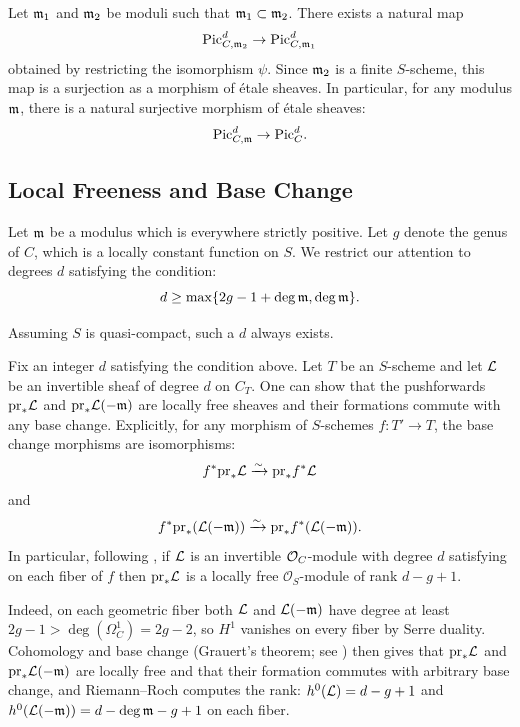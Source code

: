 Let $\mathfrak{m}_1$ and $\mathfrak{m}_2$ be moduli such that $\mathfrak{m}_1 \subset \mathfrak{m}_2$. There exists a natural map
\[
\text{Pic}_{C, \mathfrak{m}_2}^d \to \text{Pic}_{C, \mathfrak{m}_1}^d
\]
obtained by restricting the isomorphism $\psi$. Since $\mathfrak{m}_2$ is a finite $S$-scheme, this map is a surjection as a morphism of \'etale sheaves.
In particular, for any modulus $\mathfrak{m}$, there is a natural surjective morphism of \'etale sheaves:
\[
\text{Pic}_{C, \mathfrak{m}}^d \to \text{Pic}_C^d.
\]


\subsection*{Local Freeness and Base Change}
Let $\mathfrak{m}$ be a modulus which is everywhere strictly positive. Let $g$ denote the genus of $C$, which is a locally constant function on $S$. We restrict our attention to degrees $d$ satisfying the condition:
\begin{equation} \label{equation:degree-condition}
    d \geq \max\{2g - 1 + \deg \mathfrak{m}, \deg \mathfrak{m}\}.
\end{equation}

Assuming $S$ is quasi-compact, such a $d$ always exists.

Fix an integer $d$ satisfying the condition above. Let $T$ be an $S$-scheme and let $\mathcal{L}$ be an invertible sheaf of degree $d$ on $C_T$. One can show that the pushforwards $\mathrm{pr}_* \mathcal{L}$ and $\mathrm{pr}_* \mathcal{L}(-{\mathfrak{m}})$ are locally free sheaves and their formations commute with any base change. Explicitly, for any morphism of $S$-schemes $f : T' \to T$, the base change morphisms are isomorphisms:
\[
    f^* \mathrm{pr}_* \mathcal{L} \xrightarrow{\sim} \mathrm{pr}_* f^* \mathcal{L}
\]
and
\[
    f^* \mathrm{pr}_* (\mathcal{L}(-{\mathfrak{m}})) \xrightarrow{\sim} \mathrm{pr}_* f^* (\mathcal{L}(-{\mathfrak{m}})).
\]
In particular, following \cite{Guignard2018}, if $\mathcal{L}$ is an invertible $\mathcal{O}_C$-module with degree $d$ satisfying  on each fiber of $f$ then $\mathrm{pr}_* \mathcal{L}$ is a locally free $\mathcal{O}_S$-module of rank $d-g+1$.

\begin{bluemath}
Indeed, on each geometric fiber both $\mathcal{L}$ and $\mathcal{L}(-\mathfrak{m})$ have degree at
least $2g - 1 > \deg(\Omega^1_C) = 2g-2$, so $H^1$ vanishes on every fiber by Serre
duality. Cohomology and base change (Grauert's theorem; see \cite{milneAV})
then gives that
$\mathrm{pr}_* \mathcal{L}$ and $\mathrm{pr}_* \mathcal{L}(-\mathfrak{m})$ are locally free and
that their formation commutes with arbitrary base change, and Riemann--Roch
computes the rank: $h^0(\mathcal{L}) = d - g + 1$ and $h^0(\mathcal{L}(-\mathfrak{m})) = d -
\deg\mathfrak{m} - g + 1$ on each fiber.
\end{bluemath}

